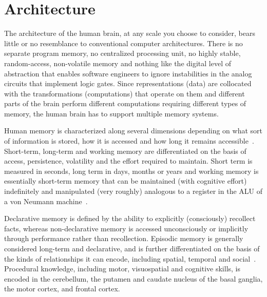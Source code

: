 \documentclass[letterpaper,11pt]{article}
\def\footnote#1{{}}
\def\urlh#1{{}}
\def\etal{{\em{et al}}}
\begin{document}

\section{Architecture}
\label{section_architecture}

The architecture of the human brain, at any scale you choose to consider, bears little or no resemblance to conventional computer architectures. There is no separate program memory, no centralized processing unit, no highly stable, random-access, non-volatile memory and nothing like the digital level of abstraction that enables software engineers to ignore instabilities in the analog circuits that implement logic gates. Since representations (data) are collocated with the transformations (computations) that operate on them and different parts of the brain perform different computations requiring different types of memory, the human brain has to support multiple memory systems.

Human memory\footnote{%
%  
  For students looking for an introduction to memory systems in the brain, you might start with Chapter~24 in~\cite{Bearetal2015} if you own or have access to either the 3rd or 4th edition, or, for a more succinct overview, try Rolls~\cite{RollsARP-01}, Raslau~\etal{}~\cite{RaslauetalAJN-15,RaslauetalAJN-15}, or, most expedient, Wikipedia ({\urlh{https://en.wikipedia.org/wiki/Neuroanatomy_of_memory}{URL}}).} 
%
is characterized along several dimensions depending on what sort of information is stored, how it is accessed and how long it remains accessible~\cite{CowanPBR-08}. Short-term, long-term and working memory are differentiated on the basis of access, persistence, volatility and the effort required to maintain. Short term is measured in seconds, long term in days, months or years and working memory is essentially short-term memory that can be maintained (with cognitive effort) indefinitely and manipulated (very roughly) analogous to a register in the ALU of a von Neumann machine~\cite{BaddeleyQJoEP-86}.

Declarative memory is defined by the ability to explicitly (consciously) recollect facts, whereas non-declarative memory is accessed unconsciously or implicitly through performance rather than recollection. Episodic memory is generally considered long-term and declarative, and is further differentiated on the basis of the kinds of relationships it can encode, including spatial, temporal and social~\cite{StachenfeldetalNATURE-17,RueckemannandBuffaloNATURE-2017,KumaranandMaguireJoN-05,NealandEichenbaum1993}. Procedural knowledge, including motor, visuospatial and cognitive skills, is encoded in the cerebellum, the putamen and caudate nucleus of the basal ganglia, the motor cortex, and frontal cortex.
\end{document}
